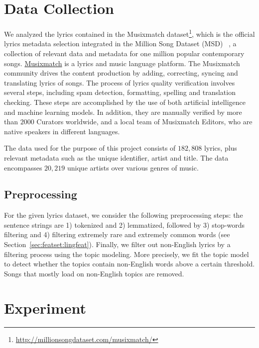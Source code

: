 \documentclass{article}
\begin{document}
\section{Data Collection}\label{sec:data}

We analyzed the lyrics contained in the Musixmatch dataset\footnote{\url{http://millionsongdataset.com/musixmatch/}}, which is the official lyrics metadata selection integrated in the Million Song Dataset (MSD) ~\cite{DBLP:conf/ismir/Bertin-MahieuxEWL11}, a collection of relevant data and metadata for one million popular contemporary songs.
\href{https://www.musixmatch.com/}{Musixmatch} is a lyrics and music language platform. The Musixmatch community drives the content production by adding, correcting, syncing and translating lyrics of songs. The process of lyrics quality verification involves several steps, including spam detection, formatting, spelling and translation checking. These steps are accomplished by the use of both artificial intelligence and machine learning models. In addition, they are manually verified by more than $2000$ Curators worldwide, and a local team of Musixmatch Editors, who are native speakers in different languages.

The data used for the purpose of this project consists of $182,808$ lyrics, plus relevant metadata such as the unique identifier, artist and title. The data encompasses $20,219$ unique artists over various genres of music.


\subsection{Preprocessing}\label{sec:setup:preproc}
For the given lyrics dataset, we consider the following preprocessing steps: the sentence strings are 1) tokenized and 2) lemmatized, followed by 3) stop-words filtering and 4) filtering extremely rare and extremely common words (see Section~\ref{sec:featset:lingfeat}). Finally, we filter out non-English lyrics by a filtering process using the topic modeling. More precisely, we fit the topic model to detect whether the topics contain non-English words above a certain threshold. Songs that mostly load on non-English topics are removed.


\section{Experiment}\label{sec:exp}
\end{document}
